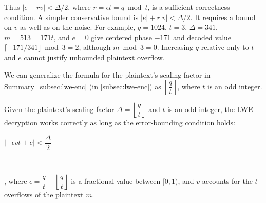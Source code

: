 Thus $|e-rv|<\Delta/2$, where $r=\epsilon t=q\bmod t$, is a sufficient correctness condition. A simpler conservative bound is $|e|+r|v|<\Delta/2$. It requires a bound on $v$ as well as on the noise. For example, $q=1024$, $t=3$, $\Delta=341$, $m=513=171t$, and $e=0$ give centered phase $-171$ and decoded value $\lceil-171/341\rfloor\bmod3=2$, although $m\bmod3=0$. Increasing $q$ relative only to $t$ and $e$ cannot justify unbounded plaintext overflow.

We can generalize the formula for the plaintext's scaling factor in Summary~\ref*{subsec:lwe-enc} (in \autoref{subsec:lwe-enc}) as $\left\lfloor\dfrac{q}{t}\right\rfloor$, where $t$ is an odd integer.


\begin{tcolorbox}[title={\textbf{\tboxlabel{\ref*{subsubsec:lwe-noise-bound}} Noise Budget for an Odd Plaintext Modulus $\bm{t}$}}]


Given the plaintext's scaling factor $\Delta=\left\lfloor\dfrac{q}{t}\right\rfloor$ and $t$ is an odd integer, the LWE decryption works correctly as long as the error-bounding condition holds:

$|-\epsilon vt + e| < \dfrac{\Delta}{2}$

$ $

, where $\epsilon = \dfrac{q}{t} - \left\lfloor\dfrac{q}{t}\right\rfloor$ is a fractional value between $[0, 1)$, and $v$ accounts for the $t$-overflows of the plaintext $m$.

\end{tcolorbox}

